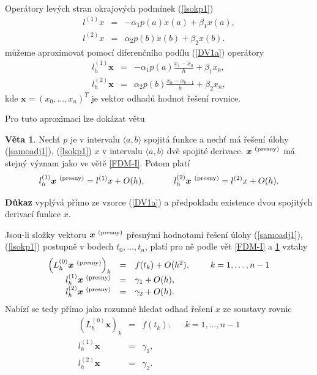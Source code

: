 \documentclass[a4paper, 12pt]{book}
\theoremstyle{definition}
\newtheorem{theorem}{Věta}[section]
\def\vc#1{\mathbf{\boldsymbol{#1}}}     %
\begin{document}
~

Operátory levých stran okrajových podmínek (\ref{lsokp1})
\begin{eqnarray}\label{opl1}
l^{(1)} x&=&-\alpha_1 p(a) \dot x(a) + \beta_1 x(a),\\ \label{opl2}
l^{(2)} x&=&\alpha_2 p(b) \dot x(b) + \beta_2 x(b).
\end{eqnarray}
můžeme aproximovat pomocí diferenčního podílu (\ref{DV1a}) operátory
\begin{eqnarray}\label{opl1h}
l_h^{(1)} \vc x&=&-\alpha_1 p(a) \frac{x_1-x_0}h + \beta_1 x_0,\\ \label{opl2h}
l_h^{(2)} \vc x&=&\alpha_2 p(b) \frac{x_n-x_{n-1}}h + \beta_2 x_n,
\end{eqnarray}
kde $\vc x=(x_0,\dots,x_n)^T$ je vektor odhadů hodnot řešení rovnice.

Pro tuto aproximaci lze dokázat větu
\begin{theorem}\label{FDM-A}
Nechť $p$ je v intervalu $\langle a,b\rangle$ spojitá funkce a nechť má řešení 
úlohy (\ref{samoadj1}), (\ref{lsokp1}) $x$ v intervalu $\langle a,b\rangle$ 
dvě spojité derivace. $\vc x^{\ \rm(presny)}$ má stejný význam jako ve 
větě \ref{FDM-I}. Potom platí
\begin{displaymath}
l_h^{(1)} \vc x^{\ \rm(presny)} = l^{(1)}x+O(h), ~~~~~~~~~~
l_h^{(2)} \vc x^{\ \rm(presny)} = l^{(2)}x+O(h).
\end{displaymath}
\end{theorem}
{\bf Důkaz} vyplývá přímo ze vzorce (\ref{DV1a}) a předpokladu existence dvou
spojitých derivací funkce $x$.

Jsou-li složky vektoru $\vc x^{\ \rm(presny)}$ přesnými hodnotami řešení úlohy
(\ref{samoadj1}), (\ref{lsokp1}) postupně v bodech $t_0,\dots,t_n$, platí pro
ně podle vět \ref{FDM-I} a \ref{FDM-A} vztahy
\begin{displaymath}
\begin{array}{rcl}
\left(L_h^{(0)} \vc x^{\ \rm(presny)}\right)_k &=& f(t_k)+O(h^2), ~~~~~~~k=1,\dots,n-1\\
l_h^{(1)} \vc x^{\ \rm(presny)} &=& \gamma_1+O(h),\\
l_h^{(2)} \vc x^{\ \rm(presny)} &=& \gamma_2+O(h).
\end{array}
\end{displaymath}
Nabízí se tedy přímo jako rozumné hledat odhad řešení $x$ ze soustavy rovnic
\begin{equation}\label{IA}
\begin{array}{rcl}
\left(L_h^{(0)} \vc x\right)_k &=& f(t_k), ~~~~~~~k=1,\dots,n-1\\
l_h^{(1)} \vc x &=& \gamma_1,\\
l_h^{(2)} \vc x &=& \gamma_2.
\end{array}
\end{equation}
\end{document}
